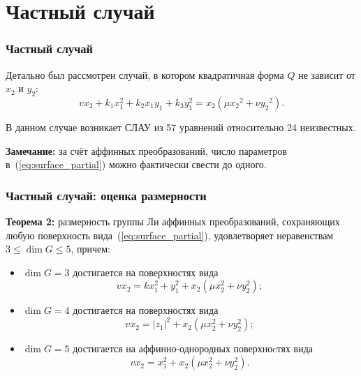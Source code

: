 \documentclass[russian,hyperref={unicode}]{beamer}
\begin{document}
\section{Частный случай}
\frame
{
	\frametitle{Частный случай}
	Детально был рассмотрен случай, в котором квадратичная форма $Q$ не зависит от $x_2$ 
   и $y_2$:
	\begin{equation}\label{eq:surface_partial}
	v x_2 + k_1 x_1^2 + k_2 x_1 y_1 + k_3 y_1^2 = x_2 (\mu {x_2}^2 + \nu {y_2}^2).
	\end{equation}

	В данном случае возникает СЛАУ из 57 уравнений относительно 24 неизвестных.
	
	\textbf{Замечание:}
	за счёт аффинных преобразований, число параметров в~(\ref{eq:surface_partial}) 
	можно фактически свести до одного.
}
\frame
{
	\frametitle{Частный случай: оценка размерности}
	\textbf{Теорема 2:}
	размерность группы Ли аффинных преобразований, сохраняющих любую 
	поверхность вида~(\ref{eq:surface_partial}), удовлетворяет неравенствам 
	$ 3 \le \dim G \le 5$, причем:
	\begin{itemize}
		\item $\dim G = 3$ достигается на поверхностях вида
		\begin{equation}\label{eq:dim3}
			v x_2 = k x_1^2 + y_1^2 + x_2 (\mu x_2^2 + \nu y_2^2);
		\end{equation}
		\item $\dim G = 4$ достигается на поверхностях вида
		\begin{equation}\label{eq:dim4}
			v x_2 = |z_1|^2 + x_2 (\mu x_2^2 + \nu y_2^2);
		\end{equation}
		\item $\dim G = 5$ достигается на аффинно-однородных поверхноcтях вида
		\begin{equation}\label{eq:dim5}
			v x_2 = x_1^2 + x_2 (\mu x_2^2 + \nu y_2^2).
		\end{equation}
	\end{itemize}
}
\frame
\end{document}
